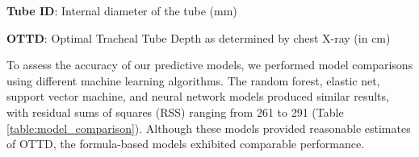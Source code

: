 \documentclass[11pt]{article}
\begin{document}
\begin{table}[h]
\caption{Descriptive statistics of Tube ID and OTTD stratified by sex}
\label{table:descriptive_statistics}
\begin{threeparttable}
\renewcommand{\TPTminimum}{\linewidth}
\begin{tablenotes}
\footnotesize
\item \textbf{Tube ID}: Internal diameter of the tube (mm)
\item \textbf{OTTD}: Optimal Tracheal Tube Depth as determined by chest X-ray (in cm)
\end{tablenotes}
\end{threeparttable}
\end{table}


To assess the accuracy of our predictive models, we performed model comparisons using different machine learning algorithms. The random forest, elastic net, support vector machine, and neural network models produced similar results, with residual sums of squares (RSS) ranging from 261 to 291 (Table {}\ref{table:model_comparison}). Although these models provided reasonable estimates of OTTD, the formula-based models exhibited comparable performance.

\begin{table}[h]
\caption{Comparison of Residual Sums of Squares (RSS) of each model}
\label{table:model_comparison}
\begin{threeparttable}
\renewcommand{\TPTminimum}{\linewidth}
\begin{tablenotes}
\footnotesize
\item 
\end{tablenotes}
\end{threeparttable}
\end{table}
\end{document}
